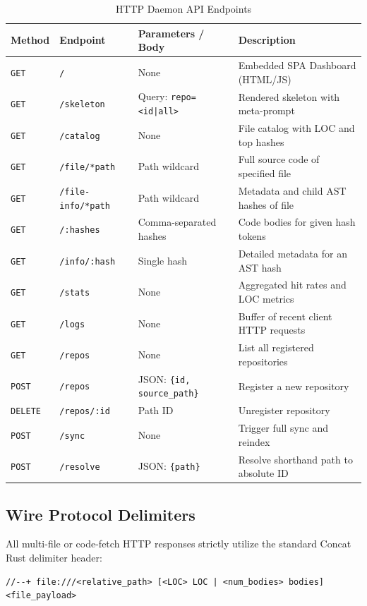 \documentclass[11pt,a4paper]{article}
\begin{document}
\begin{table}[htbp]
\centering
\small
\begin{tabular}{@{}llll@{}}
\toprule
\textbf{Method} & \textbf{Endpoint} & \textbf{Parameters / Body} & \textbf{Description} \\
\midrule
\texttt{GET} & \texttt{/} & None & Embedded SPA Dashboard (HTML/JS) \\
\texttt{GET} & \texttt{/skeleton} & Query: \texttt{repo=<id|all>} & Rendered skeleton with meta-prompt \\
\texttt{GET} & \texttt{/catalog} & None & File catalog with LOC and top hashes \\
\texttt{GET} & \texttt{/file/*path} & Path wildcard & Full source code of specified file \\
\texttt{GET} & \texttt{/file-info/*path} & Path wildcard & Metadata and child AST hashes of file \\
\texttt{GET} & \texttt{/:hashes} & Comma-separated hashes & Code bodies for given hash tokens \\
\texttt{GET} & \texttt{/info/:hash} & Single hash & Detailed metadata for an AST hash \\
\texttt{GET} & \texttt{/stats} & None & Aggregated hit rates and LOC metrics \\
\texttt{GET} & \texttt{/logs} & None & Buffer of recent client HTTP requests \\
\texttt{GET} & \texttt{/repos} & None & List all registered repositories \\
\texttt{POST} & \texttt{/repos} & JSON: \texttt{\{id, source\_path\}} & Register a new repository \\
\texttt{DELETE} & \texttt{/repos/:id} & Path ID & Unregister repository \\
\texttt{POST} & \texttt{/sync} & None & Trigger full sync and reindex \\
\texttt{POST} & \texttt{/resolve} & JSON: \texttt{\{path\}} & Resolve shorthand path to absolute ID \\
\bottomrule
\end{tabular}
\caption{HTTP Daemon API Endpoints}
\label{tab:api}
\end{table}

\subsection{Wire Protocol Delimiters}
All multi-file or code-fetch HTTP responses strictly utilize the standard Concat Rust delimiter header:
\begin{lstlisting}[style=bashstyle]
//--+ file:///<relative_path> [<LOC> LOC | <num_bodies> bodies]
<file_payload>
\end{lstlisting}
\end{document}
